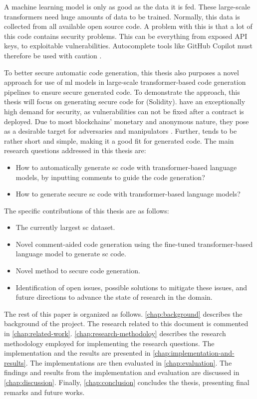 A machine learning model is only as good as the data it is fed. These large-scale transformers need huge amounts of data to be trained. Normally, this data is collected from all available open source code. A problem with this is that a lot of this code contains security problems. This can be everything from exposed API keys, to exploitable vulnerabilities. Autocomplete tools like GitHub Copilot must therefore be used with caution \cite{chen2021codex}.

To better secure automatic code generation, this thesis also purposes a novel approach for use of \acrshort{ml} models in large-scale transformer-based code generation pipelines to ensure secure generated code. To demonstrate the approach, this thesis will focus on generating secure code for  (Solidity).  have an exceptionally high demand for security, as vulnerabilities can not be fixed after a contract is deployed. Due to most blockchains' monetary and anonymous nature, they pose as a desirable target for adversaries and manipulators \cite{atzei2017survey}. Further,  tends to be rather short and simple, making it a good fit for generated code. The main research questions addressed in this thesis are:
\begin{itemize}
    \item How to automatically generate \acrlong{sc} code with transformer-based language models, by inputting comments to guide the code generation?
    \item How to generate secure \acrlong{sc} code with transformer-based language models?
\end{itemize}

\noindent
The specific contributions of this thesis are as follows:
\begin{itemize}
    \item The currently largest \acrfull{sc} dataset.
    \item Novel comment-aided code generation using the fine-tuned transformer-based language model to generate \acrlong{sc} code.
    \item Novel method to secure code generation.
    \item Identification of open issues, possible solutions to mitigate these issues, and future directions to advance the state of research in the domain.
\end{itemize}

The rest of this paper is organized as follows. \cref{chap:background} describes the background of the project. The research related to this document is commented in \cref{chap:related-work}. \cref{chap:research-methodoloy} describes the research methodology employed for implementing the research questions. The implementation and the results are presented in \cref{chap:implementation-and-results}. The implementations are then evaluated in \cref{chap:evaluation}. The findings and results from the implementation and evaluation are discussed in \cref{chap:discussion}. Finally, \cref{chap:conclusion} concludes the thesis, presenting final remarks and future works.
